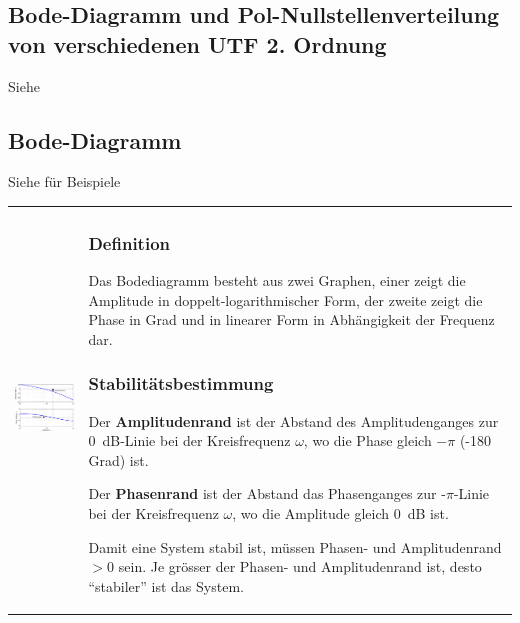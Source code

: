 \subsection{Bode-Diagramm und Pol-Nullstellenverteilung von verschiedenen UTF
2. Ordnung}
Siehe   

\subsection{Bode-Diagramm }
Siehe  für Beispiele\\
\begin{tabular}{ll}
	\parbox{7cm}{
		\includegraphics[width=7cm]{./bilder/bode-stabilitaet.png}
	}
	& \parbox{11cm}{
		\subsubsection{Definition}
		Das Bodediagramm besteht aus zwei Graphen, einer zeigt die Amplitude in
		doppelt-logarithmischer Form, der zweite zeigt die Phase in Grad und in
		linearer Form in Abhängigkeit der Frequenz dar.
		
		\subsubsection{Stabilitätsbestimmung  }
		Der {\bf Amplitudenrand} ist der Abstand des
		Amplitudenganges zur 0~dB-Linie bei der Kreisfrequenz $\omega$, wo die Phase
		gleich $-\pi$ (-180 Grad) ist. \\
		
		Der {\bf Phasenrand} ist der Abstand das Phasenganges zur
		-$\pi$-Linie bei der Kreisfrequenz $\omega$, wo die Amplitude gleich 0~dB
		ist. \\
		
		Damit eine System stabil ist, m\"ussen Phasen- und Amplitudenrand
		$>0$ sein. Je gr\"osser der Phasen- und Amplitudenrand ist, desto
		``stabiler'' ist das System.
	}
\end{tabular}

